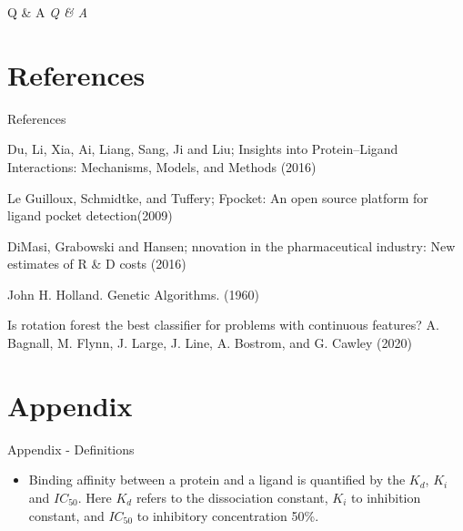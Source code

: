 \documentclass{beamer}
\begin{document}
\begin{frame}[t]{Q \& A}
  \centering \Huge
  \emph{Q \& A}
\end{frame}

\section{References}

\begin{frame}[t]{References}

\begin{thebibliography}{1}

\alert{Du,  Li,  Xia,  Ai,  Liang,  Sang,  Ji and Liu; Insights into Protein–Ligand Interactions: Mechanisms, Models, and Methods (2016)}

\alert{Le Guilloux,  Schmidtke, and Tuffery; Fpocket: An open source platform for ligand pocket detection(2009)}

\alert{DiMasi,  Grabowski and Hansen; nnovation in the pharmaceutical industry: New estimates of R \& D costs (2016)}

\alert{John H. Holland.  Genetic Algorithms. (1960)}

\alert{Is rotation forest the best classifier for problems with continuous features? A. Bagnall, M. Flynn, J. Large, J. Line, A. Bostrom, and G. Cawley (2020)}

\end{thebibliography}

\end{frame}

\section{Appendix}

\begin{frame}[t]{Appendix - Definitions}

\begin{itemize}
\item Binding affinity between a protein and a ligand is quantified by the $K_d$, $K_i$ and $IC_{50}$.
Here $K_d$ refers to the dissociation constant, $K_i$ to inhibition constant, and $IC_{50}$ to 
inhibitory concentration 50\%.
\end{itemize}
\end{frame}
\end{document}
